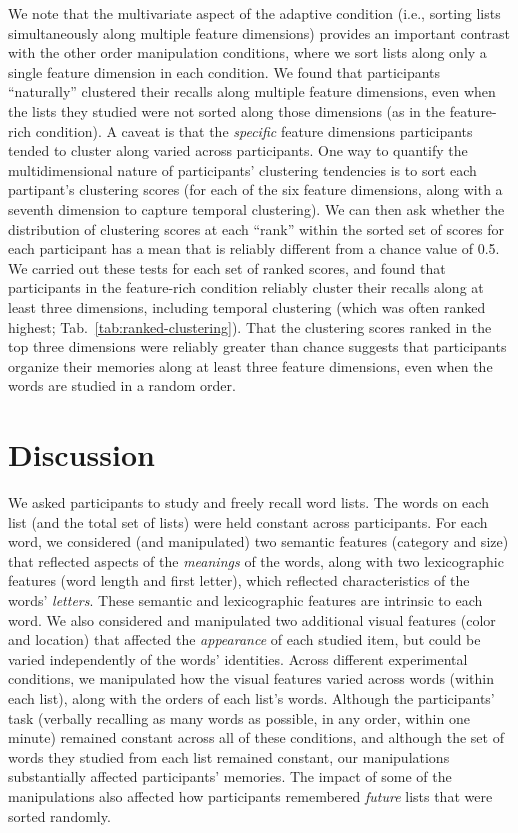 \documentclass[11pt]{article}
\begin{document}
We note that the multivariate aspect of the adaptive condition (i.e., sorting
lists simultaneously along multiple feature dimensions) provides an important
contrast with the other order manipulation conditions, where we sort lists
along only a single feature dimension in each condition. We found that
participants ``naturally'' clustered their recalls along multiple feature
dimensions, even when the lists they studied were not sorted along those
dimensions (as in the feature-rich condition). A caveat is that the
\textit{specific} feature dimensions participants tended to cluster along
varied across participants. One way to quantify the multidimensional nature of
participants' clustering tendencies is to sort each partipant's clustering
scores (for each of the six feature dimensions, along with a seventh dimension
to capture temporal clustering). We can then ask whether the distribution of
clustering scores at each ``rank'' within the sorted set of scores for each
participant has a mean that is reliably different from a chance value of 0.5.
We carried out these tests for each set of ranked scores, and found that
participants in the feature-rich condition reliably cluster their recalls along
at least three dimensions, including temporal clustering (which was often
ranked highest; Tab.~\ref{tab:ranked-clustering}). That the clustering scores
ranked in the top three dimensions were reliably greater than chance suggests
that participants organize their memories along at least three feature
dimensions, even when the words are studied in a random order.

\section*{Discussion}


We asked participants to study and freely recall word lists. The words on each
list (and the total set of lists) were held constant across participants. For
each word, we considered (and manipulated) two semantic features (category and
size) that reflected aspects of the \textit{meanings} of the words, along with
two lexicographic features (word length and first letter), which reflected
characteristics of the words' \textit{letters}. These semantic and
lexicographic features are intrinsic to each word. We also considered and
manipulated two additional visual features (color and location) that affected
the \textit{appearance} of each studied item, but could be varied independently
of the words' identities. Across different experimental conditions, we
manipulated how the visual features varied across words (within each list),
along with the orders of each list's words. Although the participants' task
(verbally recalling as many words as possible, in any order, within one minute)
remained constant across all of these conditions, and although the set of words
they studied from each list remained constant, our manipulations substantially
affected participants' memories. The impact of some of the manipulations also
affected how participants remembered \textit{future} lists that were sorted
randomly.
\end{document}
